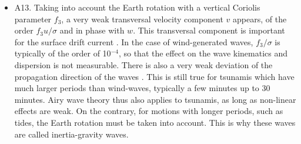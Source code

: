 \begin{itemize}
Because the equations of motion are weakly nonlinear, these different modes are coupled, with an exchange of energy between surface waves and internal waves 
\citep{Thorpe1966}. This aspect is still relatively unexplored  \citep{Osborne&Burch1980,Kudryavtsev1994}. This stratification can also be due to the 
presence of air bubbles near the surface or sediments near the bottom, with important consequences for the bottom boundary layer and wave dissipation. 
\citep[e.g.][]{Winterwerp2007,Styles&Glenn2000}.\vspace{0.3cm}
\item A13. Taking into account the Earth rotation with a vertical Coriolis parameter $f_3$, a very weak transversal velocity component $v$ appears, 
of the order  $f_3 u /\sigma$ and in phase with $w$.  This transversal component is important for the surface drift current
 \citep{Hasselmann1970,Xu&Bowen1994,Ardhuin&al.2004b,Rascle&Ardhuin2009}. In the case of wind-generated waves, 
  $f_3/\sigma$ is typically of the order of 10$^{-4}$, so that the effect on the wave kinematics and dispersion is not measurable. 
There is also a very weak deviation of the propagation direction of the waves \citep{Backus1962}. This is still true for tsunamis 
which have much larger periods than wind-waves, typically a few minutes up to 30 minutes. Airy wave theory thus also applies to tsunamis, as long as non-linear effects are 
weak. On the contrary, for motions with longer periods, such as tides, the Earth rotation must be taken into account. This is why these waves are called inertia-gravity waves. 
\end{itemize}


